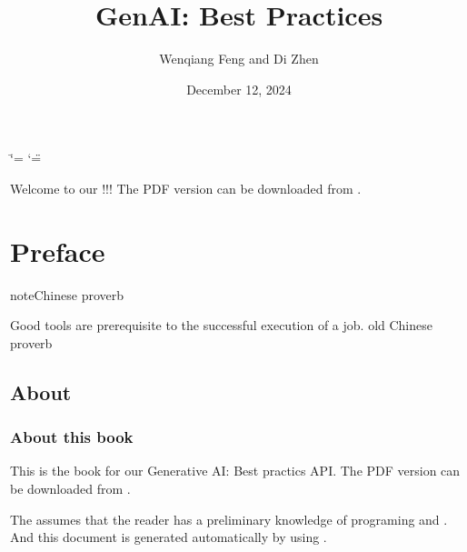 \documentclass[letterpaper,11pt,english]{sphinxmanual}
\title{GenAI: Best Practices}
\date{December 12, 2024}
\author{Wenqiang Feng and Di Zhen}
\begin{document}
\ifdefined\shorthandoff
  \ifnum\catcode`\=\string=\active\shorthandoff{=}\fi
  \ifnum\catcode`\"=\active{}\fi
\fi

\pagestyle{empty}
\sphinxmaketitle
\pagestyle{plain}
\sphinxtableofcontents
\pagestyle{normal}
\label{\detokenize{index::doc}}\label{\detokenize{index:index}}\begin{quote}

\begin{figure}[htbp]
\centering

\noindent{}
\end{figure}
\end{quote}

\sphinxAtStartPar
Welcome to our !!! The PDF version
can be downloaded from .



\sphinxstepscope


\chapter{Preface}
\label{\detokenize{preface:id1}}\label{\detokenize{preface::doc}}
\begin{sphinxadmonition}{note}{Chinese proverb}

\sphinxAtStartPar
Good tools are prerequisite to the successful execution of a job. \textendash{} old Chinese proverb
\end{sphinxadmonition}


\section{About}
\label{\detokenize{preface:about}}

\subsection{About this book}
\label{\detokenize{preface:about-this-book}}
\sphinxAtStartPar
This is the book for our Generative AI: Best practics  API.
The PDF version can be downloaded from . 

\sphinxAtStartPar
The  assumes that the reader has a preliminary knowledge of  programing and . And this
document is generated automatically by using .
\end{document}
